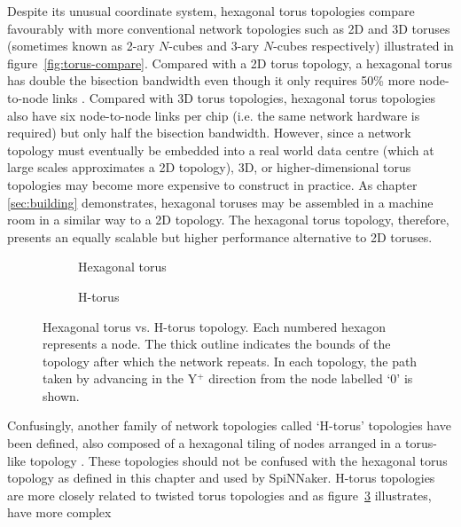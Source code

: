 		Despite its unusual coordinate system, hexagonal torus topologies compare
		favourably with more conventional network topologies such as 2D and 3D
		toruses (sometimes known as 2-ary $N$-cubes and 3-ary $N$-cubes
		respectively) \cite{dally04} illustrated in figure~\ref{fig:torus-compare}.
		Compared with a 2D torus topology, a hexagonal torus has double the
		bisection bandwidth even though it only requires 50\% more node-to-node
		links \cite{navaridas09}. Compared with 3D torus topologies, hexagonal
		torus topologies also have six node-to-node links per chip (i.e. the same
		network hardware is required) but only half the bisection bandwidth.
		However, since a network topology must eventually be embedded into a real
		world data centre (which at large scales approximates a 2D topology), 3D,
		or higher-dimensional torus topologies may become more expensive to
		construct in practice. As chapter \ref{sec:building} demonstrates,
		hexagonal toruses may be assembled in a machine room in a similar way to a
		2D topology. The hexagonal torus topology, therefore, presents an equally
		scalable but higher performance alternative to 2D toruses.
		
		\begin{figure}
			\center
			\begin{subfigure}[b]{0.45\linewidth}
				\center
				\caption{Hexagonal torus}
				\label{fig:topo-compare-hexagonal-torus}
			\end{subfigure}
			\begin{subfigure}[b]{0.45\linewidth}
				\center
				\caption{H-torus}
				\label{fig:topo-compare-h-torus}
			\end{subfigure}
			
			\caption{Hexagonal torus vs. H-torus topology. Each numbered hexagon
			represents a node. The thick outline indicates the bounds of the
			topology after which the network repeats. In each topology, the path
			taken by advancing in the Y$^+$ direction from the node labelled `0' is
			shown.}
			\label{fig:topo-compare}
		\end{figure}
		
		Confusingly, another family of network topologies called `H-torus'
		topologies have been defined, also composed of a hexagonal tiling of
		nodes arranged in a torus-like topology \cite{zhao08}. These topologies
		should not be confused with the hexagonal torus topology as defined in
		this chapter
		and used by SpiNNaker. H-torus topologies are more closely related to
		twisted torus topologies \cite{camara10} and as
		figure~\ref{fig:topo-compare} illustrates, have more complex 
	
